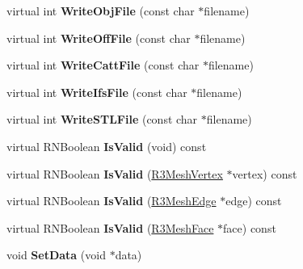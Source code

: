 \begin{DoxyCompactItemize}
\item 
virtual int {\bfseries Write\+Obj\+File} (const char $\ast$filename)\hypertarget{class_r3_mesh_a2583e408faf8020089fc1e775ea4c1cb}{}\label{class_r3_mesh_a2583e408faf8020089fc1e775ea4c1cb}

\item 
virtual int {\bfseries Write\+Off\+File} (const char $\ast$filename)\hypertarget{class_r3_mesh_a0da876be1fa1df51ef89c8f485dde473}{}\label{class_r3_mesh_a0da876be1fa1df51ef89c8f485dde473}

\item 
virtual int {\bfseries Write\+Catt\+File} (const char $\ast$filename)\hypertarget{class_r3_mesh_a4022201d13b86e973bde77186c3b1d13}{}\label{class_r3_mesh_a4022201d13b86e973bde77186c3b1d13}

\item 
virtual int {\bfseries Write\+Ifs\+File} (const char $\ast$filename)\hypertarget{class_r3_mesh_a5ecfba477c8296f405d528e322db9ac5}{}\label{class_r3_mesh_a5ecfba477c8296f405d528e322db9ac5}

\item 
virtual int {\bfseries Write\+S\+T\+L\+File} (const char $\ast$filename)\hypertarget{class_r3_mesh_a93096cce5b4cd1c8202349045cf1c0e0}{}\label{class_r3_mesh_a93096cce5b4cd1c8202349045cf1c0e0}

\item 
virtual R\+N\+Boolean {\bfseries Is\+Valid} (void) const \hypertarget{class_r3_mesh_a51c162930687c4fe1dbc23c8bbf1de17}{}\label{class_r3_mesh_a51c162930687c4fe1dbc23c8bbf1de17}

\item 
virtual R\+N\+Boolean {\bfseries Is\+Valid} (\hyperlink{class_r3_mesh_vertex}{R3\+Mesh\+Vertex} $\ast$vertex) const \hypertarget{class_r3_mesh_ac5e66ed51e57ff15f399542af6bf33bf}{}\label{class_r3_mesh_ac5e66ed51e57ff15f399542af6bf33bf}

\item 
virtual R\+N\+Boolean {\bfseries Is\+Valid} (\hyperlink{class_r3_mesh_edge}{R3\+Mesh\+Edge} $\ast$edge) const \hypertarget{class_r3_mesh_a79ce04f3f2b5f8cbbfb6795ba64e417a}{}\label{class_r3_mesh_a79ce04f3f2b5f8cbbfb6795ba64e417a}

\item 
virtual R\+N\+Boolean {\bfseries Is\+Valid} (\hyperlink{class_r3_mesh_face}{R3\+Mesh\+Face} $\ast$face) const \hypertarget{class_r3_mesh_a552e17217b6a4c326cf713fa6c5f9b42}{}\label{class_r3_mesh_a552e17217b6a4c326cf713fa6c5f9b42}

\item 
void {\bfseries Set\+Data} (void $\ast$data)\hypertarget{class_r3_mesh_a4102998ae0d2dd2184a065ae18142b67}{}\label{class_r3_mesh_a4102998ae0d2dd2184a065ae18142b67}

\end{DoxyCompactItemize}
